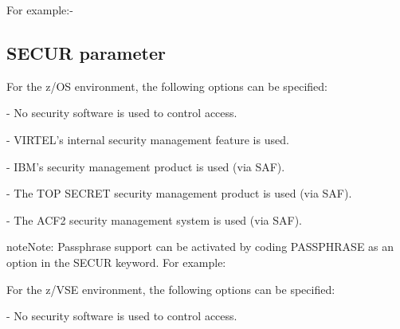 \documentclass[letterpaper,10pt,english]{sphinxmanual}
\begin{document}
For example:-

\begin{sphinxVerbatim}[commandchars=\\\{\}]
\end{sphinxVerbatim}

\ignorespaces 

\subsection{SECUR parameter}
\label{\detokenize{Installation_Guide:secur-parameter}}\label{\detokenize{Installation_Guide:index-112}}
\begin{sphinxVerbatim}[commandchars=\\\{\}]
 
\end{sphinxVerbatim}

For the z/OS environment, the following options can be specified:

 - No security software is used to control access.

 - VIRTEL’s internal security management feature is used.

 - IBM’s security management product is used (via SAF).

 - The TOP SECRET security management product is used (via SAF).

 - The ACF2 security management system is used (via SAF).

\begin{sphinxadmonition}{note}{Note:}
Passphrase support can be activated by coding PASSPHRASE as an option in the SECUR keyword. For example: 
\end{sphinxadmonition}

For the z/VSE environment, the following options can be specified:

 - No security software is used to control access.
\end{document}
